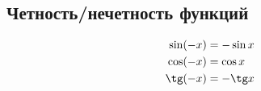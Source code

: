 \subsection*{Четность/нечетность функций}

\begin{align*}
  \sin(-x)  &= - \sin x\\
  \cos(-x)  &= \cos x\\
  \tg(-x)  &= -\tg x
\end{align*}